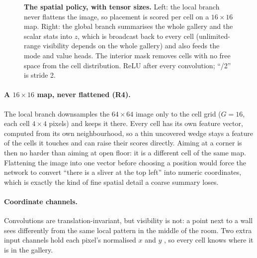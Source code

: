 \documentclass[11pt,a4paper]{article}
\begin{document}
\begin{figure}[!htbp]
\caption{\textbf{The spatial policy, with tensor sizes.} Left: the local branch never
flattens the image, so placement is scored per cell on a $16\times16$ map. Right: the global
branch summarises the whole gallery and the scalar stats into $z$, which is broadcast back to
every cell (unlimited-range visibility depends on the whole gallery) and also feeds the mode
and value heads. The interior mask removes cells with no free space from the cell
distribution. ReLU after every convolution; ``/2'' is stride 2.}
\label{fig:net}
\end{figure}

\paragraph{A $16\times16$ map, never flattened (R4).}
The local branch downsamples the $64\times64$ image only to the cell grid ($G=16$, each cell
$4\times4$ pixels) and keeps it there. Every cell has its own feature vector, computed from
its own neighbourhood, so a thin uncovered wedge stays a feature of the cells it touches and
can raise their scores directly. Aiming at a corner is then no harder than aiming at open
floor: it is a different cell of the same map. Flattening the image into one vector before
choosing a position would force the network to convert ``there is a sliver at the top left''
into numeric coordinates, which is exactly the kind of fine spatial detail a coarse summary
loses.

\paragraph{Coordinate channels.}
Convolutions are translation-invariant, but visibility is not: a point next to a wall sees
differently from the same local pattern in the middle of the room. Two extra input channels
hold each pixel's normalised $x$ and $y$ \cite{liu2018coordconv}, so every cell knows where it
is in the gallery.
\end{document}
